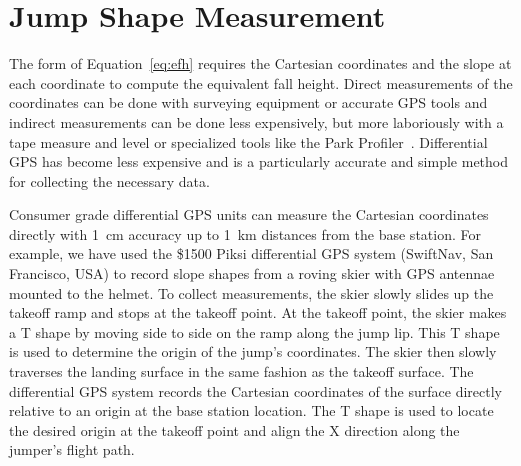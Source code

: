 \documentclass{article}
\begin{document}
\section{Jump Shape Measurement}
%
The form of Equation~\ref{eq:efh} requires the Cartesian coordinates and the
slope at each coordinate to compute the equivalent fall height. Direct
measurements of the coordinates can be done with surveying equipment or
accurate GPS tools and indirect measurements can be done less expensively, but
more laboriously with a tape measure and level or specialized tools like the
Park Profiler~. Differential GPS has become less expensive
and is a particularly accurate and simple method for collecting the necessary
data.

Consumer grade differential GPS units can measure the Cartesian coordinates
directly with 1~\si{\centi\meter} accuracy up to 1~\si{\kilo\meter} distances
from the base station. For example, we have used the \$1500 Piksi differential
GPS system (SwiftNav, San Francisco, USA) to record slope shapes from a roving
skier with GPS antennae mounted to the helmet. To collect measurements, the
skier slowly slides up the takeoff ramp and stops at the takeoff point. At the
takeoff point, the skier makes a T shape by moving side to side on the ramp
along the jump lip. This T shape is used to determine the origin of the jump's
coordinates. The skier then slowly traverses the landing surface in the same
fashion as the takeoff surface. The differential GPS system records the
Cartesian coordinates of the surface directly relative to an origin at the base
station location. The T shape is used to locate the desired origin at the
takeoff point and align the X direction along the jumper's flight path.
\end{document}
